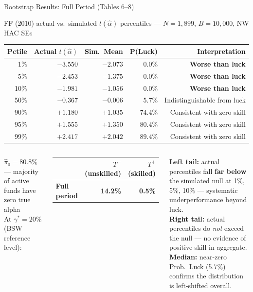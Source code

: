 \documentclass[aspectratio=169,10pt]{beamer}
\newcommand{\red}[1]{\textcolor{AlertRed}{\textbf{#1}}}
\newcommand{\green}[1]{\textcolor{SkillGreen}{\textbf{#1}}}
\begin{document}
\begin{frame}{Bootstrap Results: Full Period (Tables 6--8)}
\begin{center}
{\footnotesize FF (2010) actual vs.\ simulated $t(\hat{\alpha})$ percentiles — $N=1{,}899$, $B=10{,}000$, NW HAC SEs}
\vspace{3pt}

\setlength{\tabcolsep}{5pt}
\begin{tabular}{rrrrr}
\toprule
\textbf{Pctile} & \textbf{Actual $t(\hat{\alpha})$} & \textbf{Sim.\ Mean} & \textbf{P(Luck)} & \textbf{Interpretation}\\
\midrule
1\%  & $-3.550$ & $-2.073$ & $0.0\%$ & \red{Worse than luck} \\
5\%  & $-2.453$ & $-1.375$ & $0.0\%$ & \red{Worse than luck} \\
10\% & $-1.981$ & $-1.056$ & $0.0\%$ & \red{Worse than luck} \\
50\% & $-0.367$ & $-0.006$ & $5.7\%$ & Indistinguishable from luck \\
90\% & $+1.180$ & $+1.035$ & $74.4\%$ & Consistent with zero skill \\
95\% & $+1.555$ & $+1.350$ & $80.4\%$ & Consistent with zero skill \\
99\% & $+2.417$ & $+2.042$ & $89.4\%$ & Consistent with zero skill \\
\bottomrule
\end{tabular}
\end{center}
\vspace{3pt}
\begin{columns}[T]
{\footnotesize
$\hat{\pi}_0 = \mathbf{80.8\%}$ — majority of active funds have zero true alpha\\[5pt]
At $\gamma^* = 20\%$ (BSW reference level):
\vspace{3pt}
\begin{center}
\setlength{\tabcolsep}{4pt}
\begin{tabular}{lrr}
\toprule
 & $T^-$ (unskilled) & $T^+$ (skilled)\\
\midrule
\textbf{Full period} & \red{14.2\%} & \green{0.5\%} \\
\bottomrule
\end{tabular}
\end{center}}

{\footnotesize
\textbf{Left tail:} actual percentiles fall \red{far below} the simulated null at 1\%, 5\%, 10\% — systematic underperformance beyond luck.\\[5pt]
\textbf{Right tail:} actual percentiles do \emph{not} exceed the null — no evidence of positive skill in aggregate.\\[5pt]
\textbf{Median:} near-zero Prob.\ Luck (5.7\%) confirms the distribution is left-shifted overall.}
\end{columns}
\end{frame}
\end{document}

